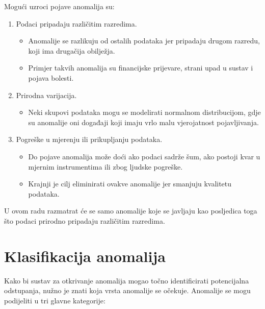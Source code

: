 \documentclass[utf8, diplomski, numeric]{fer}
\begin{document}
Mogući uzroci pojave anomalija su:
\begin{enumerate}
\item Podaci pripadaju različitim razredima.
\begin{itemize}
\item Anomalije se razlikuju od ostalih podataka jer pripadaju drugom razredu, koji ima drugačija obilježja.
\item Primjer takvih anomalija su financijske prijevare, strani upad u sustav i pojava bolesti.
\end{itemize}

\item Prirodna varijacija.
\begin{itemize}
\item Neki skupovi podataka mogu se modelirati normalnom distribucijom, gdje su anomalije oni događaji koji imaju vrlo malu vjerojatnost pojavljivanja.
\end{itemize}

\item Pogreške u mjerenju ili prikupljanju podataka.
\begin{itemize}
\item Do pojave anomalija može doći ako podaci sadrže šum, ako postoji kvar u mjernim instrumentima ili zbog ljudske pogreške.
\item Krajnji je cilj eliminirati ovakve anomalije jer smanjuju kvalitetu podataka.
\end{itemize}

\end{enumerate}

U ovom radu razmatrat će se samo anomalije koje se javljaju kao posljedica toga što podaci prirodno pripadaju različitim razredima.


\section{Klasifikacija anomalija}
Kako bi sustav za otkrivanje anomalija mogao točno identificirati potencijalna odstupanja, nužno je znati koja vrsta anomalije se očekuje. Anomalije se mogu podijeliti u tri glavne kategorije:
\end{document}
